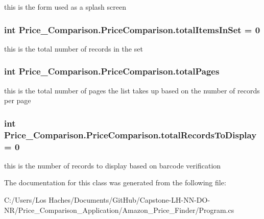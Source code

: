 this is the form used as a splash screen \hypertarget{class_price___comparison_1_1_price_comparison_a1ed3ccdec43ddc79d7d77bb7a8b9657c}{
\subsubsection[{total\-Items\-In\-Set}]{\setlength{\rightskip}{0pt plus 5cm}int Price\-\_\-\-Comparison.\-Price\-Comparison.\-total\-Items\-In\-Set = 0\hspace{0.3cm}{\ttfamily [static]}}}\label{class_price___comparison_1_1_price_comparison_a1ed3ccdec43ddc79d7d77bb7a8b9657c}
this is the total number of records in the set \hypertarget{class_price___comparison_1_1_price_comparison_a61b472a9b894cc9f6124cd8450688436}{
\subsubsection[{total\-Pages}]{\setlength{\rightskip}{0pt plus 5cm}int Price\-\_\-\-Comparison.\-Price\-Comparison.\-total\-Pages\hspace{0.3cm}{\ttfamily [static]}}}\label{class_price___comparison_1_1_price_comparison_a61b472a9b894cc9f6124cd8450688436}
this is the total number of pages the list takes up based on the number of records per page \hypertarget{class_price___comparison_1_1_price_comparison_a9e1cc855ebfb83f7acacebd5b50af064}{
\subsubsection[{total\-Records\-To\-Display}]{\setlength{\rightskip}{0pt plus 5cm}int Price\-\_\-\-Comparison.\-Price\-Comparison.\-total\-Records\-To\-Display = 0\hspace{0.3cm}{\ttfamily [static]}}}\label{class_price___comparison_1_1_price_comparison_a9e1cc855ebfb83f7acacebd5b50af064}
this is the number of records to display based on barcode verification 

The documentation for this class was generated from the following file\-:\begin{DoxyCompactItemize}
\item 
C\-:/\-Users/\-Los Haches/\-Documents/\-Git\-Hub/\-Capstone-\/\-L\-H-\/\-N\-N-\/\-D\-O-\/\-N\-R/\-Price\-\_\-\-Comparison\-\_\-\-Application/\-Amazon\-\_\-\-Price\-\_\-\-Finder/Program.\-cs\end{DoxyCompactItemize}
